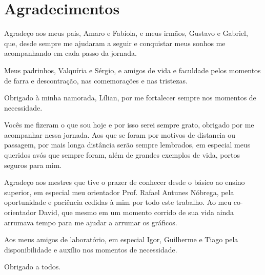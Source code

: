 %
%

\chapter*{Agradecimentos}

Agradeço aos meus pais, Amaro e Fabíola, e meus irmãos, Gustavo e Gabriel, que, desde sempre me ajudaram a seguir e conquistar meus sonhos me acompanhando em cada passo da jornada.

Meus padrinhos, Valquíria e Sérgio, e amigos de vida e faculdade pelos momentos de farra e descontração, nas comemorações e nas tristezas.

Obrigado à minha namorada, Lílian, por me fortalecer sempre nos momentos de necessidade.

Vocês me fizeram o que sou hoje e por isso serei sempre grato, obrigado por me acompanhar nessa jornada. Aos que se foram por motivos de distancia ou passagem, por mais longa distância serão sempre lembrados, em especial meus queridos avós que sempre foram, além de grandes exemplos de vida, portos seguros para mim. 

Agradeço aos mestres que tive o prazer de conhecer desde o básico ao ensino superior, em especial meu orientador Prof. Rafael Antunes Nóbrega, pela oportunidade e paciência cedidas à mim por todo este trabalho. Ao meu co-orientador David, que mesmo em um momento corrido de sua vida ainda arrumava tempo para me ajudar a arrumar os gráficos.

Aos meus amigos de laboratório, em especial Igor, Guilherme e Tiago pela disponibilidade e auxílio nos momentos de necessidade.

Obrigado a todos.